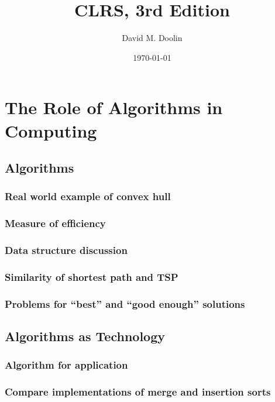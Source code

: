 \documentclass{article}
\title{CLRS, 3rd Edition}
\date{\today}
\author{David M. Doolin}
\begin{document}
\maketitle


\tableofcontents

\section{The Role of Algorithms in Computing}

\subsection{Algorithms}

\subsubsection{Real world example of convex hull}

\subsubsection{Measure of efficiency}

\subsubsection{Data structure discussion}

\subsubsection{Similarity of shortest path and TSP}

\subsubsection{Problems for ``best'' and ``good enough'' solutions}

\subsection{Algorithms as Technology}

\subsubsection{Algorithm for application}

\subsubsection{Compare implementations of merge and insertion sorts}
\end{document}
